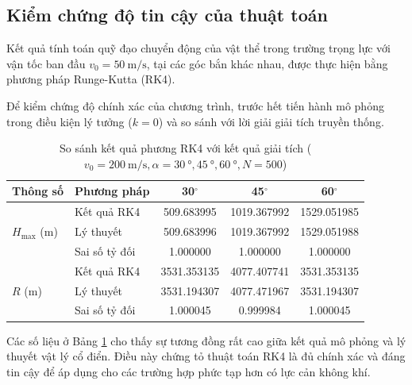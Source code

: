 \subsection{Kiểm chứng độ tin cậy của thuật toán}

Kết quả tính toán quỹ đạo chuyển động của vật thể trong trường trọng lực với vận tốc ban đầu \(v_0 = \qty{50}{\meter\per\second}\), tại các góc bắn khác nhau, được thực hiện bằng phương pháp Runge-Kutta (RK4).

Để kiểm chứng độ chính xác của chương trình, trước hết tiến hành mô phỏng trong điều kiện lý tưởng (\(k = 0\)) và so sánh với lời giải giải tích truyền thống.

\begin{table}[t]
    \centering
    \begin{tabular}{@{}llccc@{}}
      \toprule
      \textbf{Thông số} & \textbf{Phương pháp} & \textbf{30$^\circ$} & \textbf{45$^\circ$} & \textbf{60$^\circ$} \\
      \midrule
      \multirow{3}{*}{\(H_{\max}\) (\unit{\meter})}
                        & Kết quả RK4   & \num{509.683995}  & \num{1019.367992}  & \num{1529.051985} \\
                        & Lý thuyết     & \num{509.683996}  & \num{1019.367992}  & \num{1529.051988} \\
                        & Sai số tỷ đối & \num{1.000000}  & \num{1.000000}  & \num{1.000000} \\
      \midrule
      \multirow{3}{*}{\(R\) (\unit{\meter})}
                        & Kết quả RK4   & \num{3531.353135}  & \num{4077.407741}  & \num{3531.353135} \\
                        & Lý thuyết     & \num{3531.194307}  & \num{4077.471967}  & \num{3531.194307} \\
                        & Sai số tỷ đối & \num{1.000045}  & \num{0.999984}  & \num{1.000045} \\
      \bottomrule
    \end{tabular}
    \caption{So sánh kết quả phương RK4 với kết quả giải tích (\(v_0 = \qty{200}{\meter\per\second}, \alpha = \qty{30}{\degree},\qty{45}{\degree},\qty{60}{\degree}, N = 500\))}\label{tab:kiem_chung}
\end{table}

Các số liệu ở Bảng \ref{tab:kiem_chung} cho thấy sự tương đồng rất cao giữa kết quả mô phỏng và lý thuyết vật lý cổ điển. Điều này chứng tỏ thuật toán RK4 là đủ chính xác và đáng tin cậy để áp dụng cho các trường hợp phức tạp hơn có lực cản không khí.

